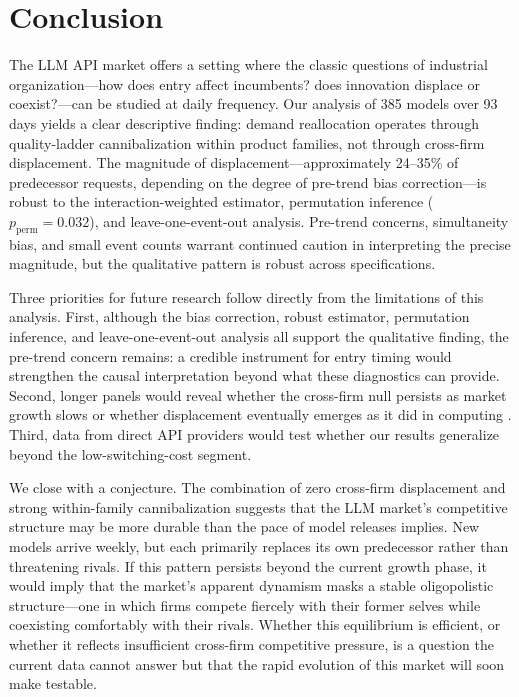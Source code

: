 \documentclass[11pt, a4paper]{article}
\begin{document}
\section{Conclusion}
\label{sec:conclusion}

The LLM API market offers a setting where the classic questions of industrial organization---how does entry affect incumbents? does innovation displace or coexist?---can be studied at daily frequency. Our analysis of 385 models over 93 days yields a clear descriptive finding: demand reallocation operates through quality-ladder cannibalization within product families, not through cross-firm displacement. The magnitude of displacement---approximately 24--35\% of predecessor requests, depending on the degree of pre-trend bias correction---is robust to the \citet{sunAbraham2021} interaction-weighted estimator, permutation inference ($p_{\text{perm}} = 0.032$), and leave-one-event-out analysis. Pre-trend concerns, simultaneity bias, and small event counts warrant continued caution in interpreting the precise magnitude, but the qualitative pattern is robust across specifications.

Three priorities for future research follow directly from the limitations of this analysis. First, although the \citet{roth2022pretest} bias correction, \citet{sunAbraham2021} robust estimator, permutation inference, and leave-one-event-out analysis all support the qualitative finding, the pre-trend concern remains: a credible instrument for entry timing would strengthen the causal interpretation beyond what these diagnostics can provide. Second, longer panels would reveal whether the cross-firm null persists as market growth slows or whether displacement eventually emerges as it did in computing \citep{bresnahan1999technological}. Third, data from direct API providers would test whether our results generalize beyond the low-switching-cost segment.

We close with a conjecture. The combination of zero cross-firm displacement and strong within-family cannibalization suggests that the LLM market's competitive structure may be more durable than the pace of model releases implies. New models arrive weekly, but each primarily replaces its own predecessor rather than threatening rivals. If this pattern persists beyond the current growth phase, it would imply that the market's apparent dynamism masks a stable oligopolistic structure---one in which firms compete fiercely with their former selves while coexisting comfortably with their rivals. Whether this equilibrium is efficient, or whether it reflects insufficient cross-firm competitive pressure, is a question the current data cannot answer but that the rapid evolution of this market will soon make testable.
\end{document}
